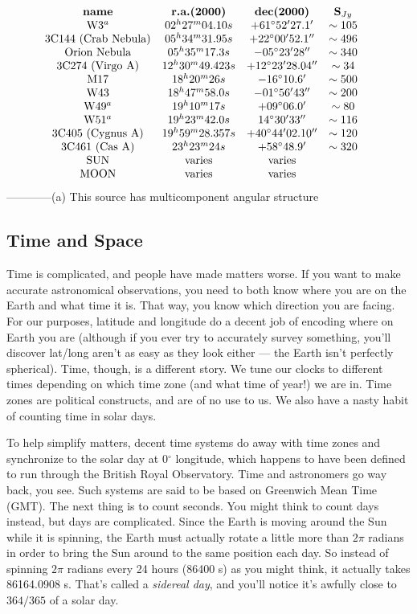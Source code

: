 \documentclass[11pt,preprint]{aastex}
\begin{document}
$$\vbox{\halign{ \hfil#\hfil\ \ & \hfil#\hfil\ \ & \hfil#\hfil\ \ &    
\hfil#\hfil\ \ \ \cr

{\bf name} & {\bf r.a.(2000)} & {\bf dec(2000)} & {\bf S$_{Jy}$} \cr

W3$^a$              & $02^h 27^m 04.10s$ &$+61^\circ 52' 27.1'$ & $\sim 105$ \cr
3C144 (Crab Nebula) & $05^h 34^m 31.95s$ &$+22^\circ 00' 52.1''$ & $\sim 496$ \cr
Orion Nebula        & $05^h 35^m 17.3s$ & $-05^\circ 23' 28''$ & $\sim 340$ \cr
3C274 (Virgo A)     & $12^h 30^m 49.423s$ & $+12^\circ 23' 28.04''$ & $\sim 34$ \cr
M17                 & $18^h 20^m 26s$ & $-16^\circ 10.6'$ & $\sim 500$ \cr
W43                 & $18^h 47^m 58.0s$ & $-01^\circ 56' 43''$ & $\sim 200$ \cr
W49$^a$             & $19^h 10^m 17s$ & $+09^\circ 06.0'$ & $\sim 80$ \cr
W51$^a$             & $19^h 23^m 42.0s$ & $14^\circ 30' 33''$ & $\sim 116$ \cr
3C405 (Cygnus A)    & $19^h 59^m 28.357s$ & $+40^\circ 44' 02.10''$ & $\sim 120$ \cr  
3C461 (Cas A)       & $23^h 23^m 24s$ & $+58^\circ 48.9'$ & $\sim 320$ \cr 
SUN                 &   varies       &   varies \cr
MOON                &   varies       &   varies \cr
}}$$
\noindent------------(a) This source has multicomponent angular structure

\subsection{Time and Space}

Time is complicated, and people have made matters worse.  If you want to
make accurate astronomical observations, you need to both know where you
are on the Earth and what time it is.  That way, you know which direction you
are facing.  For our purposes, latitude and longitude do a decent job of encoding where on Earth
you are (although if you ever try to accurately survey something, you'll discover
lat/long aren't as easy as they look either --- the Earth isn't perfectly spherical).
Time, though, is a different story.  We tune our clocks to different times depending on
which time zone (and what time of year!) we are in.  Time zones are political constructs,
and are of no use to us.  We also have a nasty habit of counting time in solar days.

To help simplify matters, decent time systems do away with time zones and synchronize
to the solar day at 0$^\circ$ longitude, which happens to have been defined to run
through the British Royal Observatory.  Time and astronomers go way back, you see.
Such systems are said to be based on Greenwich Mean Time (GMT).  The next thing is to
count seconds.  You might think to count days instead, but days are complicated.
Since the Earth is moving around the Sun while it is spinning, the Earth must actually
rotate a little more than $2\pi$ radians in order to bring the Sun around to the same
position each day.  So instead of spinning $2\pi$ radians every 24 hours (86400 s) as
you might think, it actually takes 86164.0908 s.  That's called a {\it sidereal day},
and you'll notice it's awfully close to $364/365$ of a solar day.
\end{document}
